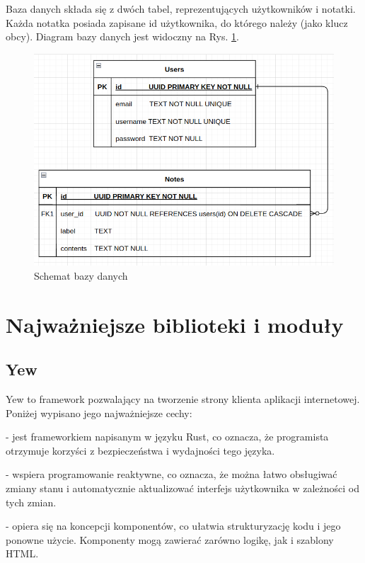 \documentclass[a4paper,twoside,12pt]{book}
\begin{document}
Baza danych składa się z dwóch tabel, reprezentujących użytkowników i notatki.
Każda notatka posiada zapisane id użytkownika, do którego należy (jako klucz obcy).
Diagram bazy danych jest widoczny na Rys. \ref {fig:schemat-bazy}.

\begin{figure}[H]
\centering
\includegraphics[width=1.0\textwidth]{./images/schemat-bazy.png}
\caption{Schemat bazy danych}
\label{fig:schemat-bazy}
\end{figure}


\section{Najważniejsze biblioteki i moduły}
\subsection{Yew}

Yew to framework pozwalający na tworzenie strony klienta aplikacji internetowej.
Poniżej wypisano jego najważniejsze cechy:

- jest frameworkiem napisanym w języku Rust, co oznacza,
że programista otrzymuje korzyści z bezpieczeństwa i wydajności tego języka.

- wspiera programowanie reaktywne, co oznacza, że można łatwo obsługiwać zmiany stanu i automatycznie aktualizować interfejs użytkownika w zależności od tych zmian.

- opiera się na koncepcji komponentów, co ułatwia strukturyzację kodu i jego ponowne użycie. Komponenty mogą zawierać zarówno logikę, jak i szablony HTML.
\end{document}
